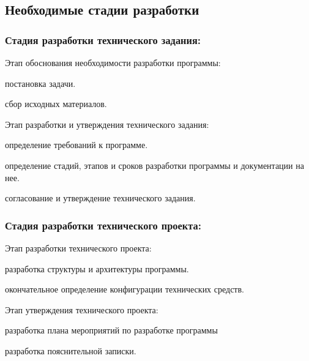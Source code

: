 
\subsection{Необходимые стадии разработки}

\subsubsection{Стадия разработки технического задания:}
\begin{my_enumerate}
\item Этап обоснования необходимости разработки программы:
    \begin{my_enumerate}
    \item постановка задачи.
    \item сбор исходных материалов.
    \end{my_enumerate}
\item Этап разработки и утверждения технического задания:
    \begin{my_enumerate}
    \item определение требований к программе.
    \item определение стадий, этапов и сроков разработки программы и документации на нее.
    \item согласование и утверждение технического задания.
    \end{my_enumerate}
\end{my_enumerate}

\subsubsection{Стадия разработки технического проекта:}
\begin{my_enumerate}
\item Этап разработки технического проекта:
    \begin{my_enumerate}
    \item разработка структуры и архитектуры программы.
    \item окончательное определение конфигурации технических средств.
    \end{my_enumerate}
\item Этап утверждения технического проекта:
    \begin{my_enumerate}
    \item разработка плана мероприятий по разработке программы
    \item разработка пояснительной записки.
    \end{my_enumerate}
\end{my_enumerate}


